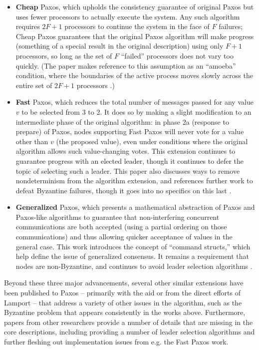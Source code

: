 \documentclass{article}
\begin{document}
\begin{itemize}
\item \textbf{Cheap} Paxos, which upholds the consistency guarantee of original Paxos but uses fewer processors to actually execute the system. Any such algorithm requires $2F + 1$ processors to continue the system in the face of $F$ failures; Cheap Paxos guarantees that the original Paxos algorithm will make progress (something of a special result in the original description) using only $F + 1$ processors, so long as the set of $F$ ``failed'' processors does not vary too quickly. (The paper makes reference to this assumption as an ``amoeba'' condition, where the boundaries of the active process moves slowly across the entire set of $2F + 1$ processors \cite{cheap-paxos}.)
\item \textbf{Fast} Paxos, which reduces the total number of messages passed for any value $v$ to be selected from 3 to 2. It does so by making a slight modification to an intermediate phase of the original algorithm: in phase 2a (response to prepare) of Paxos, nodes supporting Fast Paxos will never vote for a value other than $v$ (the proposed value), even under conditions where the original algorithm allows such value-changing votes. This extension continues to guarantee progress with an elected leader, though it continues to defer the topic of selecting such a leader. This paper also discusses ways to remove nondeterminism from the algorithm extension, and references further work to defeat Byzantine failures, though it goes into no specifics on this last \cite{fast-paxos}.
\item \textbf{Generalized} Paxos, which presents a mathematical abstraction of Paxos and Paxos-like algorithms to guarantee that non-interfering concurrent communications are both accepted (using a partial ordering on those communications) and thus allowing quicker acceptance of values in the general case. This work introduces the concept of ``command structs,'' which help define the issue of generalized consensus. It remains a requirement that nodes are non-Byzantine, and continues to avoid leader selection algorithms \cite{generalized-paxos}.
\end{itemize}

Beyond these three major advancements, several other similar extensions have been published to Paxos -- primarily with the aid or from the direct efforts of Lamport -- that address a variety of other issues in the algorithm, such as the Byzantine problem that appears consistently in the works above. Furthermore, papers from other researchers provide a number of details that are missing in the core descriptions, including providing a number of leader selection algorithms and further fleshing out implementation issues from e.g. the Fast Paxos work.
\end{document}
